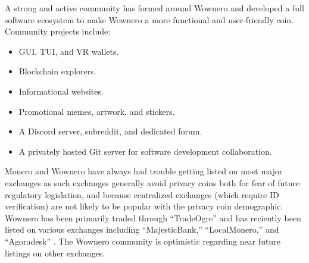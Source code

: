A strong and active community has formed around Wownero and developed a full software ecosystem to make Wownero a more functional and user-friendly coin. Community projects include:

\begin{itemize}
    \item GUI, TUI, and VR wallets\cite{wowlet}.
    \item Blockchain explorers\cite{muchwowblocks}.
    \item Informational websites\cite{wowbsite,slimecash}.
    \item Promotional memes, artwork, and stickers\cite{suchwow}.
    \item A Discord server, subreddit, and dedicated forum\cite{wowrum}.
    \item A privately hosted Git server for software development collaboration\cite{wowrepo}.
\end{itemize}

Monero and Wownero have always had trouble getting listed on most major exchanges as such exchanges generally avoid privacy coins both for fear of future regulatory legislation, and because centralized exchanges (which require ID verification) are not likely to be popular with the privacy coin demographic. Wownero has been primarily traded through ``TradeOgre'' and has reciently been listed on various exchanges including ``MajesticBank,'' ``LocalMonero,'' and ``Agoradesk'' \cite{jwinterview}. The Wownero community is optimistic regarding near future listings on other exchanges.
